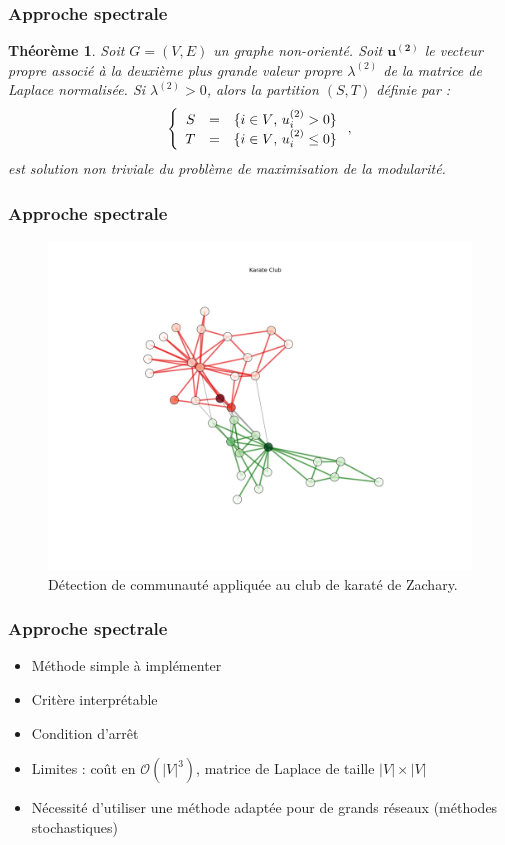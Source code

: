 \documentclass[c]{beamer}
\newtheorem*{theofr}{Théorème}
\begin{document}
\begin{frame}
    \frametitle{Approche spectrale}

    \begin{theofr}
        Soit $G = (V, E)$ un graphe non-orienté. Soit $\mathbf{u^{(2)}}$ le vecteur
        propre associé à la deuxième plus grande valeur propre $\lambda^{(2)}$
        de la matrice de Laplace normalisée. Si $\lambda^{(2)} > 0$, alors la
        partition $(S, T)$ définie par :
        \[
            \left\{
                \begin{array}{r c l}
                    S & = & \{ i \in V \text{, } u^{(2)}_i > 0 \} \\
                    T & = & \{ i \in V \text{, } u^{(2)}_i \leq 0 \}
                \end{array}
            \right. ,
        \]
        est solution non triviale du problème de maximisation de la modularité.

    \end{theofr}

\end{frame}

\begin{frame}
    \frametitle{Approche spectrale}
    \begin{figure}
        \includegraphics[width=.8\textwidth]{./figures/karate_club_split.png}
        \caption{Détection de communauté appliquée au club de karaté de
        Zachary.}
    \end{figure}
\end{frame}

\begin{frame}
    \frametitle{Approche spectrale}
    \begin{itemize}
        \item Méthode simple à implémenter
        \item Critère interprétable
        \item Condition d'arrêt
        \item Limites : coût en $\mathcal{O} (|V|^3)$, matrice de Laplace de
            taille $|V| \times |V|$
        \item Nécessité d'utiliser une méthode adaptée pour de grands réseaux
            (méthodes stochastiques)
    \end{itemize}
\end{frame}
\end{document}
